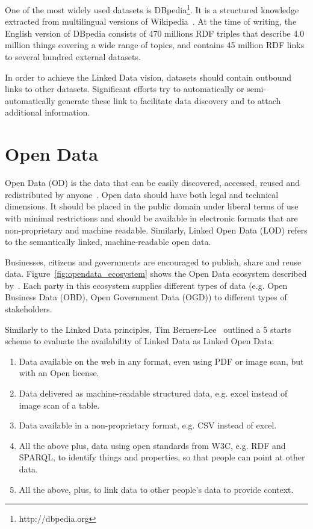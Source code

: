 One of the most widely used datasets is DBpedia\footnote{http://dbpedia.org}. It is a structured knowledge extracted from multilingual versions of Wikipedia~\cite{Bizer:WebSemJorunal:09}. At the time of writing, the English version of DBpedia consists of 470 millions RDF triples that describe 4.0 million things covering a wide range of topics, and contains 45 million RDF links to several hundred external datasets.

In order to achieve the Linked Data vision, datasets should contain outbound links to other datasets. Significant efforts try to automatically or semi-automatically generate these link to facilitate data discovery and to attach additional information.

\section{Open Data}\label{sec:openData}

Open Data (OD) is the data that can be easily discovered, accessed, reused and redistributed by anyone~\cite{Davies:Report:15}. Open data should have both legal and technical dimensions. It should be placed in the public domain under liberal terms of use with minimal restrictions and should be available in electronic formats that are non-proprietary and machine readable. Similarly, Linked Open Data (LOD) refers to the semantically linked, machine-readable open data.

Businesses, citizens and governments are encouraged to publish, share and reuse data. Figure~\ref{fig:opendata_ecosystem} shows the Open Data ecosystem described by~\cite{Deloitte:Report:12}. Each party in this ecosystem supplies different types of data (e.g. Open Business Data (OBD), Open Government Data (OGD)) to different types of stakeholders.

\begin{figure}[ht!]
\end{figure}

Similarly to the Linked Data principles, Tim Berners-Lee~\cite{Berners-Lee:W3C:06} outlined a 5 starts scheme to evaluate the availability of Linked Data as Linked Open Data:

\begin{enumerate}
	\item Data available on the web in any format, even using PDF or image scan, but with an Open license.
	\item Data delivered as machine-readable structured data, e.g. excel instead of image scan of a table.
	\item Data available in a non-proprietary format, e.g. CSV instead of excel.
	\item All the above plus, data using open standards from W3C, e.g. RDF and SPARQL, to identify things and properties, so that people can point at other data.
	\item All the above, plus, to link data to other people's data to provide context.
\end{enumerate}

